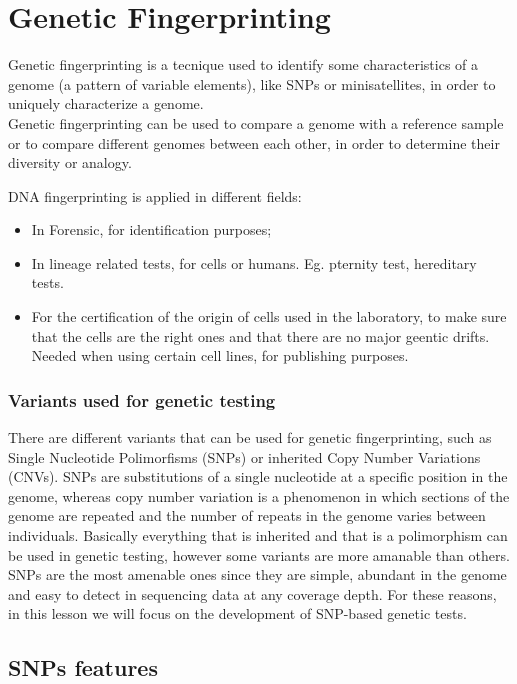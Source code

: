 \graphicspath{{chapters/03/}}

\chapter{Genetic Fingerprinting}
Genetic fingerprinting is a tecnique used to identify some characteristics of a genome (a pattern of variable elements), like SNPs or minisatellites, in order to uniquely characterize a genome.\\
Genetic fingerprinting can be used to compare a genome with a reference sample or to compare different genomes between each other, in order to determine their diversity or analogy.

DNA fingerprinting is applied in different fields:

\begin{itemize}
	\item In Forensic, for identification purposes;
	\item In lineage related tests, for cells or humans. Eg. pternity test, hereditary tests.
	\item For the certification of the origin of cells used in the laboratory, to make sure that the cells are the right ones and that there are no major geentic drifts. Needed when using certain cell lines, for publishing purposes.
\end{itemize}


\subsection{Variants used for genetic testing}

There are different variants that can be used for genetic fingerprinting, such as Single Nucleotide Polimorfisms (SNPs) or inherited Copy Number Variations (CNVs).
SNPs are substitutions of a single nucleotide at a specific position in the genome, whereas copy number variation is a phenomenon in which sections of the genome are repeated and the number of repeats in the genome varies between individuals.
Basically everything that is inherited and that is a polimorphism can be used in genetic testing, however some variants are more amanable than others.
SNPs are the most amenable ones since they are simple, abundant in the genome and easy to detect in sequencing data at any coverage depth. For these reasons, in this lesson we will focus on the development of SNP-based genetic tests.

\section{SNPs features}

